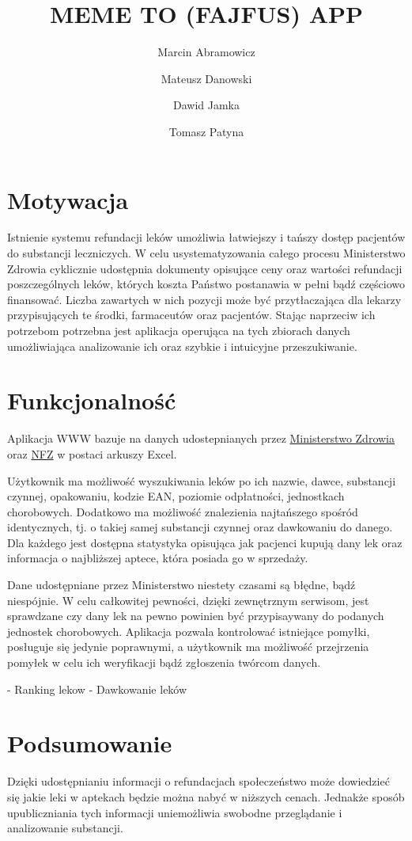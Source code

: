 \documentclass{article}
\title{MEME TO (FAJFUS) APP}
\author{Marcin Abramowicz \and Mateusz Danowski \and Dawid Jamka \and Tomasz Patyna}
\begin{document}
\maketitle


\section{Motywacja}

Istnienie systemu refundacji leków umożliwia łatwiejszy i tańszy dostęp pacjentów do substancji leczniczych. W celu usystematyzowania całego procesu Ministerstwo Zdrowia cyklicznie udostępnia dokumenty opisujące ceny oraz wartości refundacji poszczególnych leków, których koszta Państwo postanawia w pełni bądź częściowo finansować. Liczba zawartych w nich pozycji może być przytłaczająca dla lekarzy przypisujących te środki, farmaceutów oraz pacjentów. Stając naprzeciw ich potrzebom potrzebna jest aplikacja operująca na tych zbiorach danych umożliwiająca analizowanie ich oraz szybkie i intuicyjne przeszukiwanie.


\section{Funkcjonalność}

Aplikacja WWW bazuje na danych udostepnianych przez
\href{https://www.gov.pl/web/zdrowie/obwieszczenia-ministra-zdrowia-lista-lekow-refundowanych?fbclid=IwAR1U3YB3yON5EN2s1qdYRbcIeh7iDxqeOtQoEYGFvX9ozGDWdURIK2JOMRs}
{Ministerstwo Zdrowia}
oraz \href{https://www.nfz.gov.pl/aktualnosci/aktualnosci-centrali/komunikat-dgl,7465.html?fbclid=IwAR0F41XjLwTg7XQdUjeYpE_KS4VVZk50etlbYDpwxhxOR2ZLdslMatUtbEU}{NFZ}
w postaci arkuszy Excel.

Użytkownik ma możliwość wyszukiwania leków po ich nazwie, dawce, substancji czynnej, opakowaniu, kodzie EAN, poziomie odpłatności, jednostkach chorobowych. Dodatkowo ma możliwość znalezienia najtańszego spośród identycznych, tj. o takiej samej substancji czynnej oraz dawkowaniu do danego. Dla każdego jest dostępna statystyka opisująca jak pacjenci kupują dany lek oraz informacja o najbliższej aptece, która posiada go w sprzedaży. 

Dane udostępniane przez Ministerstwo niestety czasami są błędne, bądź niespójnie. W celu całkowitej pewności, dzięki zewnętrznym serwisom, jest sprawdzane czy dany lek na pewno powinien być przypisaywany do podanych jednostek chorobowych. Aplikacja pozwala kontrolować istniejące pomyłki, posługuje się jedynie poprawnymi, a użytkownik ma możliwość przejrzenia pomyłek w celu ich weryfikacji bądź zgłoszenia twórcom danych.


- Ranking lekow
- Dawkowanie leków


\section{Podsumowanie}

Dzięki udostępnianiu informacji o refundacjach społeczeństwo może dowiedzieć się jakie leki w aptekach będzie można nabyć w niższych cenach. Jednakże sposób upubliczniania tych informacji uniemożliwia swobodne przeglądanie i analizowanie substancji.
\end{document}
